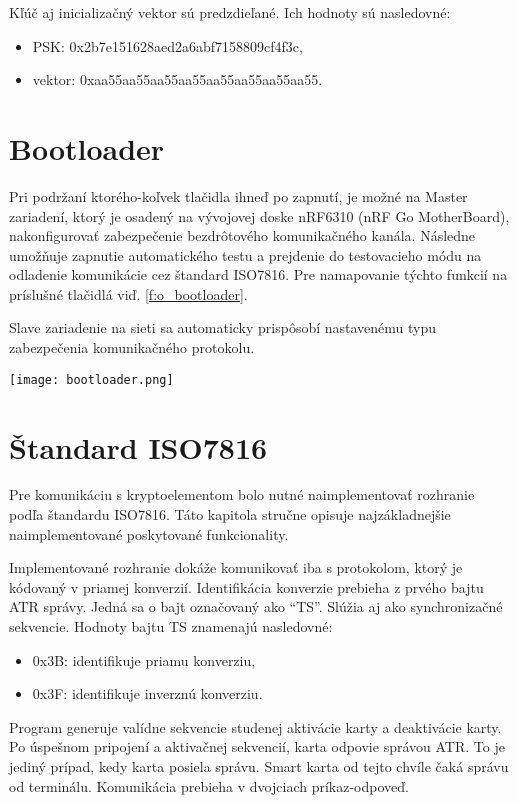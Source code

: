 \documentclass[12pt,a4wide,oneside,openright]{report}
\newcommand{\quotes}[1]{``#1''}
\begin{document}
Kľúč aj inicializačný vektor sú predzdieľané.
Ich hodnoty sú nasledovné:
	\singlespacing
\begin{itemize}
	\item PSK:    0x2b7e151628aed2a6abf7158809cf4f3c,
	\item vektor: 0xaa55aa55aa55aa55aa55aa55aa55aa55.
\end{itemize}
	\onehalfspacing

\section{Bootloader} \label{bootloader}
	Pri podržaní ktorého-koľvek tlačidla ihneď po zapnutí, je možné na Master zariadení, ktorý je osadený na vývojovej doske nRF6310 (nRF Go MotherBoard), nakonfigurovať zabezpečenie bezdrôtového komunikačného kanála. Následne umožňuje zapnutie automatického testu a prejdenie do testovacieho módu na odladenie komunikácie cez štandard ISO7816.
Pre namapovanie týchto funkcií na príslušné tlačidlá viď. \ref{f:o_bootloader}.
	
	Slave zariadenie na sieti sa automaticky prispôsobí nastavenému typu zabezpečenia komunikačného protokolu.
\begin{figure*}[!htb]
	\centering
	\texttt{[image: bootloader.png]}
	\caption{Konfigurácia nastavení po zapnutí\cite{nrfug}.}
	\label{f:o_bootloader}
\end{figure*}

\section{Štandard ISO7816}
	Pre komunikáciu s kryptoelementom bolo nutné naimplementovať rozhranie podľa štandardu ISO7816. Táto kapitola stručne opisuje najzákladnejšie naimplementované poskytované funkcionality.
	
	Implementované rozhranie dokáže komunikovať iba s protokolom, ktorý je kódovaný v priamej konverzií. Identifikácia konverzie prebieha z prvého bajtu ATR správy. Jedná sa o bajt označovaný ako \quotes{TS}. Slúžia aj ako synchronizačné sekvencie. Hodnoty bajtu TS znamenajú nasledovné:
	\singlespacing	
	\begin{itemize}
		\item 0x3B: identifikuje priamu konverziu,
		\item 0x3F: identifikuje inverznú konverziu.
	\end{itemize}
	\onehalfspacing
	
	Program generuje valídne sekvencie studenej aktivácie karty a deaktivácie karty. Po úspešnom pripojení a aktivačnej sekvencií, karta odpovie správou ATR. To je jediný prípad, kedy karta posiela správu. Smart karta od tejto chvíle čaká správu od terminálu. Komunikácia prebieha v dvojciach príkaz-odpoveď.
	
\end{document}

